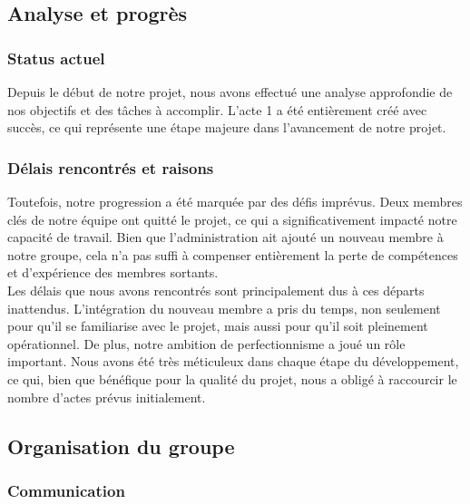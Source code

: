 

\subsection{Analyse et progrès}

\subsubsection{Status actuel}

Depuis le début de notre projet, nous avons effectué une analyse approfondie de nos objectifs et des tâches à accomplir. 
L'acte 1 a été entièrement créé avec succès, ce qui représente une étape majeure dans l'avancement de notre projet.

\subsubsection{Délais rencontrés et raisons}

Toutefois, notre progression a été marquée par des défis imprévus. 
Deux membres clés de notre équipe ont quitté le projet, ce qui a significativement impacté notre capacité de travail. 
Bien que l'administration ait ajouté un nouveau membre à notre groupe, cela n'a pas suffi à compenser entièrement la perte de compétences et d'expérience des membres sortants.
\\


Les délais que nous avons rencontrés sont principalement dus à ces départs inattendus. 
L'intégration du nouveau membre a pris du temps, non seulement pour qu'il se familiarise avec le projet, mais aussi pour qu'il soit pleinement opérationnel. De plus, notre ambition de perfectionnisme a joué un rôle important. 
Nous avons été très méticuleux dans chaque étape du développement, ce qui, bien que bénéfique pour la qualité du projet, nous a obligé à raccourcir le nombre d'actes prévus initialement.
\subsection{Organisation du groupe}

\subsubsection{Communication}

